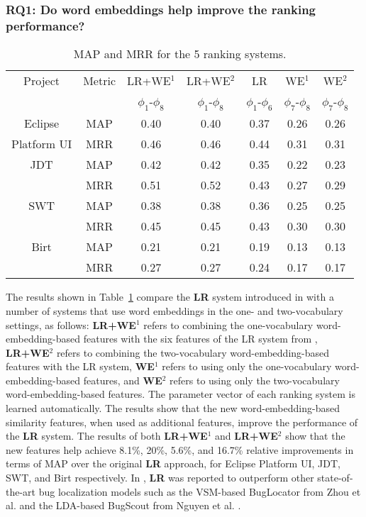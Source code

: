 \subsubsection{\textbf{RQ1:} Do word embeddings help improve the ranking performance?}
\label{sec:evaluation:rq1}

\begin{table}[t]
\centering
\caption{MAP and MRR for the 5 ranking systems.}
\begin{adjustbox}{width=0.47\textwidth}
\begin{tabular}{|c|c|c|c|c|c|c|} \hline
Project & Metric & LR+WE$^1$ & LR+WE$^2$ & LR & WE$^1$ & WE$^2$\\
& & $\phi_1$-$\phi_8$ & $\phi_1$-$\phi_8$ & $\phi_1$-$\phi_6$ & $\phi_7$-$\phi_8$ &$\phi_7$-$\phi_8$ \\ \hline
Eclipse & MAP & 0.40 & 0.40 & 0.37 & 0.26 & 0.26\\
Platform UI& MRR & 0.46 & 0.46 & 0.44 & 0.31 & 0.31\\ \hline
JDT& MAP & 0.42 & 0.42 & 0.35 & 0.22 & 0.23\\
& MRR & 0.51 & 0.52 & 0.43 & 0.27 & 0.29\\ \hline
SWT& MAP & 0.38 & 0.38 & 0.36 & 0.25 & 0.25\\
& MRR & 0.45 & 0.45 & 0.43 & 0.30 & 0.30\\ \hline
Birt& MAP & 0.21 & 0.21 & 0.19 & 0.13 & 0.13\\
& MRR & 0.27 & 0.27 & 0.24 & 0.17 & 0.17\\ \hline
\end{tabular}
\end{adjustbox}
\label{tab:comparison}
\end{table}

The results shown in Table~\ref{tab:comparison} compare the \textbf{LR} system introduced in  \cite{Ye:FSE14} with a number of systems that use word embeddings in the one- and two-vocabulary settings, as follows: \textbf{LR+WE$^1$} refers to combining the one-vocabulary word-embedding-based features with the six features of the LR system from \cite{Ye:FSE14}, \textbf{LR+WE$^2$} refers to combining the two-vocabulary word-embedding-based features with the LR system, \textbf{WE$^1$} refers to using only the one-vocabulary word-embedding-based features, and \textbf{WE$^2$} refers to using only the two-vocabulary word-embedding-based features. The parameter vector of each ranking system is learned automatically. The results show that the new word-embedding-based similarity features, when used as additional features, improve the performance of the \textbf{LR} system. The results of both \textbf{LR+WE$^1$} and \textbf{LR+WE$^2$} show that the new features help achieve 8.1\%, 20\%, 5.6\%, and 16.7\% relative improvements in terms of MAP over the original \textbf{LR} approach, for Eclipse Platform UI, JDT, SWT, and Birt respectively. In \cite{Ye:FSE14}, \textbf{LR} was reported to outperform other state-of-the-art bug localization models such as the VSM-based BugLocator from Zhou et al. \cite{Zhou:2012:BFM:2337223.2337226} and the LDA-based BugScout from Nguyen et al. \cite{Nguyen:2011:TAN:2190078.2190181}.

